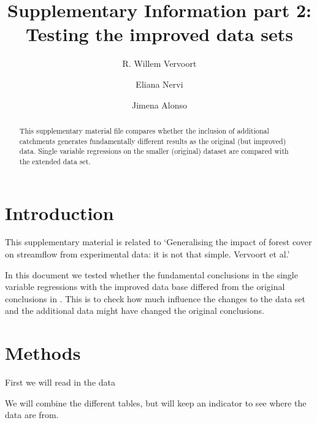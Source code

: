\documentclass[]{elsarticle} %
\begin{document}
\begin{frontmatter}

  \title{Supplementary Information part 2: Testing the improved data sets}
    \author[]{R. Willem Vervoort%
  }
    \author[]{Eliana Nervi}
    \author[]{Jimena Alonso}
  
  \begin{abstract}
  This supplementary material file compares whether the inclusion of additional catchments generates fundamentally different results as the original (but improved) data. Single variable regressions on the smaller (original) dataset are compared with the extended data set.
  \end{abstract}
  
 \end{frontmatter}

\setcounter{table}{0} \renewcommand{\thetable}{S\arabic{table}} \setcounter{figure}{0} \renewcommand{\thefigure}{S\arabic{figure}}

\hypertarget{introduction}{%
\section{Introduction}\label{introduction}}

This supplementary material is related to `Generalising the impact of forest cover on streamflow from experimental data: it is not that simple. Vervoort et al.'

In this document we tested whether the fundamental conclusions in the single variable regressions with the improved data base differed from the original conclusions in \citet{zhang2017}. This is to check how much influence the changes to the data set and the additional data might have changed the original conclusions.

\hypertarget{methods}{%
\section{Methods}\label{methods}}

First we will read in the data

We will combine the different tables, but will keep an indicator to see where the data are from.
\end{document}
